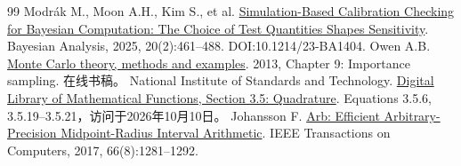 \begin{thebibliography}{99}
 Modrák M., Moon A.H., Kim S., et al. \href{https://doi.org/10.1214/23-BA1404}{Simulation-Based Calibration Checking for Bayesian Computation: The Choice of Test Quantities Shapes Sensitivity}. Bayesian Analysis, 2025, 20(2):461--488. DOI:10.1214/23-BA1404.
 Owen A.B. \href{https://artowen.su.domains/mc/}{Monte Carlo theory, methods and examples}. 2013, Chapter 9: Importance sampling. 在线书稿。
 National Institute of Standards and Technology. \href{https://dlmf.nist.gov/3.5}{Digital Library of Mathematical Functions, Section 3.5: Quadrature}. Equations 3.5.6, 3.5.19--3.5.21，访问于2026年10月10日。
 Johansson F. \href{https://doi.org/10.1109/TC.2017.2690633}{Arb: Efficient Arbitrary-Precision Midpoint-Radius Interval Arithmetic}. IEEE Transactions on Computers, 2017, 66(8):1281--1292.
\end{thebibliography}
